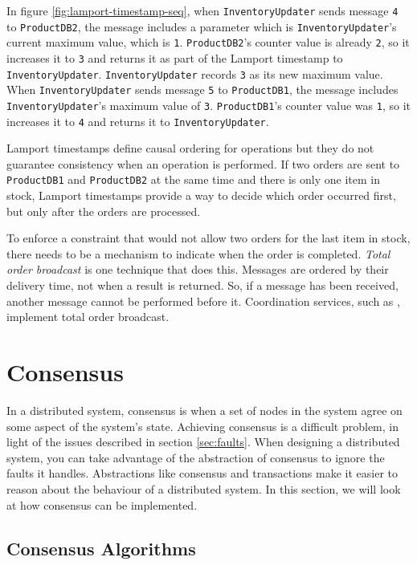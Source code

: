 In figure \ref{fig:lamport-timestamp-seq}, when \texttt{InventoryUpdater} sends message \texttt{4} to \texttt{ProductDB2},
the message includes a parameter which is \texttt{InventoryUpdater}'s current maximum value, which is \texttt{1}.
\texttt{ProductDB2}'s counter value is already \texttt{2},
so it increases it to \texttt{3} and returns it as part of the Lamport timestamp to \texttt{InventoryUpdater}.
\texttt{InventoryUpdater} records \texttt{3} as its new maximum value.
When \texttt{InventoryUpdater} sends message \texttt{5} to \texttt{ProductDB1},
the message includes \texttt{InventoryUpdater}'s maximum value of \texttt{3}.
\texttt{ProductDB1}'s counter value was \texttt{1}, so it increases it to \texttt{4} and returns it to \texttt{InventoryUpdater}.

Lamport timestamps define causal ordering for operations but they do not guarantee consistency when an operation is performed.
If two orders are sent to \texttt{ProductDB1} and \texttt{ProductDB2} at the same time and there is only one item in stock,
Lamport timestamps provide a way to decide which order occurred first, but only after the orders are processed.

To enforce a constraint that would not allow two orders for the last item in stock,
there needs to be a mechanism to indicate when the order is completed.
\emph{Total order broadcast} is one technique that does this.
Messages are ordered by their delivery time, not when a result is returned.
So, if a message has been received, another message cannot be performed before it.
Coordination services, such as , implement total order broadcast.


\section{Consensus}\label{sec:consensus}

In a distributed system, consensus is when a set of nodes in the system agree on some aspect of the system's state.
Achieving consensus is a difficult problem, in light of the issues described in section \ref{sec:faults}.
When designing a distributed system, you can take advantage of the abstraction of consensus to ignore the faults it handles.
Abstractions like consensus and transactions \cite{distributed2-notes} make it easier to reason about the behaviour of a distributed system.
In this section, we will look at how consensus can be implemented.

\subsection{Consensus Algorithms}

